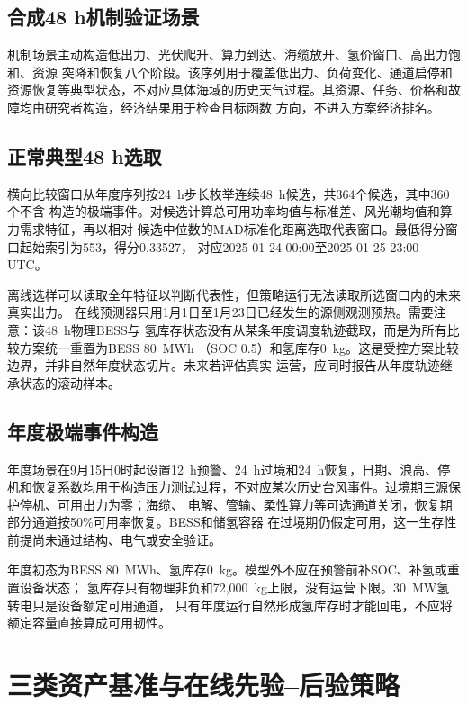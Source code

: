 \subsection{合成48 h机制验证场景}

机制场景主动构造低出力、光伏爬升、算力到达、海缆放开、氢价窗口、高出力饱和、资源
突降和恢复八个阶段。该序列用于覆盖低出力、负荷变化、通道启停和资源恢复等典型状态，不对应具体海域的历史天气过程。其资源、任务、价格和故障均由研究者构造，经济结果用于检查目标函数
方向，不进入方案经济排名。

\subsection{正常典型48 h选取}

横向比较窗口从年度序列按24~h步长枚举连续48~h候选，共364个候选，其中360个不含
构造的极端事件。对候选计算总可用功率均值与标准差、风光潮均值和算力需求特征，再以相对
候选中位数的MAD标准化距离选取代表窗口。最低得分窗口起始索引为553，得分0.33527，
对应2025-01-24 00:00至2025-01-25 23:00 UTC。

离线选样可以读取全年特征以判断代表性，但策略运行无法读取所选窗口内的未来真实出力。
在线预测器只用1月1日至1月23日已经发生的源侧观测预热。需要注意：该48~h物理BESS与
氢库存状态没有从某条年度调度轨迹截取，而是为所有比较方案统一重置为BESS 80~MWh
（SOC 0.5）和氢库存0~kg。这是受控方案比较边界，并非自然年度状态切片。未来若评估真实
运营，应同时报告从年度轨迹继承状态的滚动样本。

\subsection{年度极端事件构造}

年度场景在9月15日0时起设置12~h预警、24~h过境和24~h恢复，日期、浪高、停机和恢复系数均用于构造压力测试过程，不对应某次历史台风事件。过境期三源保护停机、可用出力为零；海缆、
电解、管输、柔性算力等可选通道关闭，恢复期部分通道按50\%可用率恢复。BESS和储氢容器
在过境期仍假定可用，这一生存性前提尚未通过结构、电气或安全验证。

年度初态为BESS 80~MWh、氢库存0~kg。模型外不应在预警前补SOC、补氢或重置设备状态；
氢库存只有物理非负和72,000~kg上限，没有运营下限。30~MW氢转电只是设备额定可用通道，
只有年度运行自然形成氢库存时才能回电，不应将额定容量直接算成可用韧性。

\section{三类资产基准与在线先验--后验策略}

